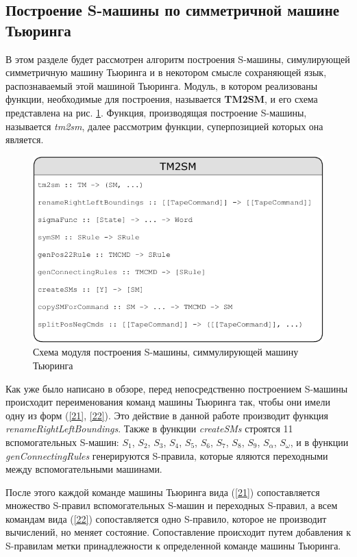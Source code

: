 \documentclass[14pt]{matmex-diploma-custom}
\begin{document}
\subsection{Построение S-машины по симметричной машине Тьюринга}
В этом разделе будет рассмотрен алгоритм построения S-машины, симулирующей симметричную машину Тьюринга и в некотором смысле сохраняющей язык, распознаваемый этой машиной Тьюринга. Модуль, в котором реализованы функции, необходимые для построения, называется \textbf{TM2SM}, и его схема представлена на рис. \ref{fig:TM2SM}. Функция, производящая построение S-машины, называется \textit{tm2sm}, далее рассмотрим функции, суперпозицией которых она является.

\begin{figure}[H]
\centering
  \includegraphics[width=\linewidth]{pics/TM2SM.pdf}
  \caption{Схема модуля построения S-машины, симмулирующей машину Тьюринга}
  \label{fig:TM2SM}
\end{figure}

Как уже было написано в обзоре, перед непосредственно построением S-машины происходит переименования команд машины Тьюринга так, чтобы они имели одну из форм (\ref{21}, \ref{22}). Это действие в данной работе производит функция \textit{renameRightLeftBoundings}. Также в функции \textit{createSMs} строятся 11 вспомогательных S-машин: $S_1$, $S_2$, $S_3$, $S_4$, $S_5$, $S_6$, $S_7$, $S_8$, $S_9$, $S_{\alpha}$, $S_{\omega}$, и в функции \textit{genConnectingRules} генерируются S-правила, которые яляются переходными между вспомогательными машинами. 

После этого каждой команде машины Тьюринга вида (\ref{21}) сопоставляется множество S-правил вспомогательных S-машин и переходных S-правил, а всем командам вида (\ref{22}) сопоставляется одно S-правило, которое не производит вычислений, но меняет состояние. Сопоставление происходит путем добавления к S-правилам метки принадлежности к определенной команде машины Тьюринга. 
\end{document}

